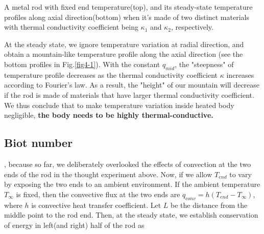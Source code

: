 \begin{marginfigure}
\caption{A metal rod with fixed end temperature(top), and its steady-state temperature profiles along axial direction(bottom) when it's made of two distinct materials with thermal conductivity coefficient being $\kappa_1$ and $\kappa_2$, respectively.}
\label{fig4-1}
\end{marginfigure}
At the steady state, we ignore temperature variation at radial direction, and obtain a mountain-like temperature profile along the axial direction (see the bottom profiles in Fig.\ref{fig4-1}). With the constant $q_{mid}$, the "steepness" of temperature profile decreases as the thermal conductivity coefficient $\kappa$ increases according to Fourier's law. As a result, the "height" of our mountain will decrease if the rod is made of materials that have larger thermal conductivity coefficient. We thus conclude that to make temperature variation inside heated body negligible, \textbf{the body needs to be highly thermal-conductive.}

\subsection{Biot number}
, because so far, we deliberately overlooked the effects of convection at the two ends of the rod in the thought experiment above. Now, if we allow $T_{end}$ to vary by exposing the two ends to an ambient environment. If the ambient temperature $T_{\infty}$ is fixed, then the convective flux at the two ends are $q_{conv}=h(T_{end}-T_{\infty})$, where $h$ is convective heat transfer coefficient. Let $L$ be the distance from the middle point to the rod end. Then, at the steady state, we establish conservation of energy in left(and right) half of the rod as

